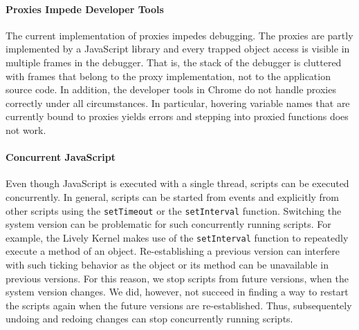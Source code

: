 \paragraph{Proxies Impede Developer Tools}
The current implementation of proxies impedes debugging.
The proxies are partly implemented by a JavaScript library and every trapped object access is visible in multiple frames in the debugger.
That is, the stack of the debugger is cluttered with frames that belong to the proxy implementation, not to the application source code.
In addition, the developer tools in Chrome do not handle proxies correctly under all circumstances.
In particular, hovering variable names that are currently bound to proxies yields errors and stepping into proxied functions does not work.

\paragraph{Concurrent JavaScript}
Even though JavaScript is executed with a single thread, scripts can be executed concurrently.
In general, scripts can be started from events and explicitly from other scripts using the \lstinline{setTimeout} or the \lstinline{setInterval} function.
Switching the system version can be problematic for such concurrently running scripts.
For example, the Lively Kernel makes use of the \lstinline{setInterval} function to repeatedly execute a method of an object.
Re-establishing a previous version can interfere with such ticking behavior as the object or its method can be unavailable in previous versions.
For this reason, we stop scripts from future versions, when the system version changes.
We did, however, not succeed in finding a way to restart the scripts again when the future versions are re-established.
Thus, subsequentely undoing and redoing changes can stop concurrently running scripts.

